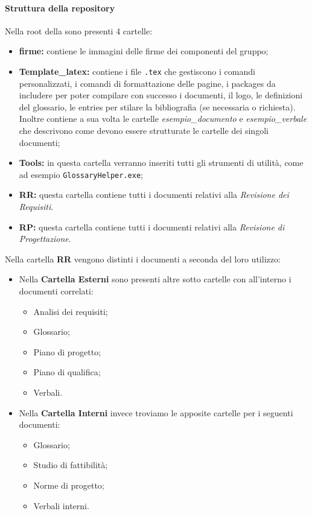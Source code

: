 \paragraph{Struttura della repository}%
Nella root della  sono presenti 4 cartelle: 
\begin{itemize}
    \item \textbf{firme:} contiene le immagini delle firme dei componenti del gruppo;
    \item \textbf{Template\_{}latex:} contiene i file \texttt{.tex} che gestiscono i comandi personalizzati, i comandi di formattazione delle pagine, i packages da includere per poter compilare con successo i documenti, il logo, le definizioni del glossario, le entries per stilare la bibliografia (se necessaria o richiesta). Inoltre contiene a sua volta le cartelle \emph{esempio\_{}documento} e \emph{esempio\_{}verbale} che descrivono come devono essere strutturate le cartelle dei singoli documenti;
    \item \textbf{Tools:} in questa cartella verranno inseriti tutti gli strumenti di utilità, come ad esempio \texttt{GlossaryHelper.exe};
    \item \textbf{RR:} questa cartella contiene tutti i documenti relativi alla \textit{Revisione dei Requisiti}.
    \item \textbf{RP:} questa cartella contiene tutti i documenti relativi alla \textit{Revisione di Progettazione}.
\end{itemize}
Nella cartella \textbf{RR} vengono distinti i documenti a seconda del loro utilizzo:
\begin{itemize}
    \item Nella \textbf{Cartella Esterni} sono presenti altre sotto cartelle con all'interno i documenti correlati:
    \begin{itemize}
        \item Analisi dei requisiti;
        \item Glossario;
        \item Piano di progetto;
        \item Piano di qualifica;
        \item Verbali.
    \end{itemize}
    \item Nella \textbf{Cartella Interni} invece troviamo le apposite cartelle per i seguenti documenti:
    \begin{itemize}
        \item Glossario;
        \item Studio di fattibilità; 
        \item Norme di progetto;
        \item Verbali interni.
    \end{itemize}
\end{itemize}

